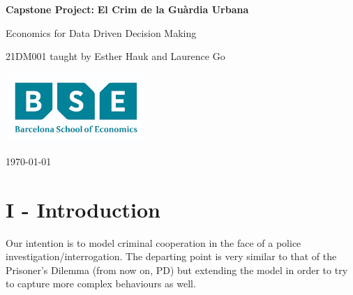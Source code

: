 \documentclass[11pt, a4paper]{article}
\begin{document}
\begin{titlepage}
    \begin{center}
        \vspace*{3cm}
            
        \Huge
        \textbf{Capstone Project:}
        \textbf{El Crim de la Guàrdia Urbana}
            
        \vspace{1cm}
        \huge
        Economics for Data Driven Decision Making
            
        \vspace{1.5cm}
        \Large
            
        
            
        \vfill
        \begin{center}21DM001 taught by Esther Hauk and Laurence Go \end{center}
        
        \vspace{1cm}
            
        \includegraphics[width=0.4\textwidth]{bse_logo.png}
        \\
        
        \Large
        
        \today
            
    \end{center}
\end{titlepage}



\newpage

\section*{I - Introduction}

Our intention is to model criminal cooperation in the face of a police investigation/interrogation. The departing point is very similar to that of the Prisoner’s Dilemma (from now on, PD) but extending the model in order to try to capture more complex behaviours as well. 
\end{document}
